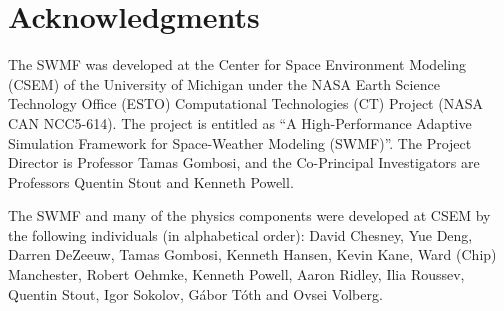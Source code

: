 \section{Acknowledgments}

The SWMF was developed at the Center for Space Environment Modeling
(CSEM) of the University of Michigan under the NASA Earth Science
Technology Office (ESTO) Computational Technologies (CT) Project (NASA
CAN NCC5-614). The project is entitled as ``A High-Performance
Adaptive Simulation Framework for Space-Weather Modeling (SWMF)''.
The Project Director is Professor Tamas Gombosi, and the Co-Principal
Investigators are Professors Quentin Stout and Kenneth Powell.

The SWMF and many of the physics components were developed at CSEM
by the following individuals (in alphabetical order):
David Chesney, Yue Deng,
Darren DeZeeuw, Tamas Gombosi, Kenneth Hansen, Kevin Kane, Ward (Chip)
Manchester, Robert Oehmke, Kenneth Powell, Aaron Ridley, Ilia Roussev,
Quentin Stout, Igor Sokolov, G\'abor T\'oth and Ovsei Volberg.

